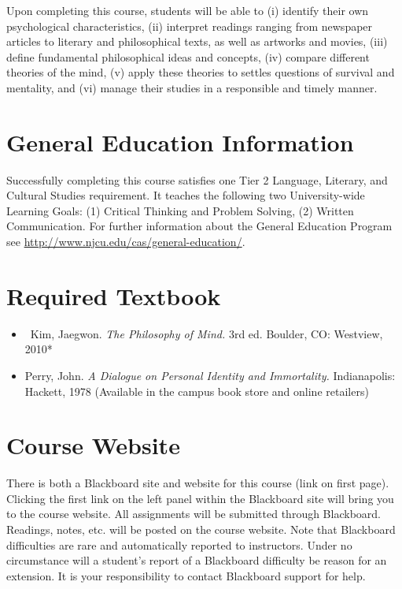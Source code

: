 \documentclass[article,oneside]{memoir}
\begin{document}
Upon completing this course, students will be able to  (i) identify their own psychological characteristics, (ii) interpret readings ranging from newspaper articles to literary and philosophical texts, as well as artworks and movies, (iii) define fundamental philosophical ideas and concepts, (iv) compare different theories of the mind, (v) apply these theories to settles questions of survival and mentality,  and  (vi) manage their studies in a responsible and timely manner. 





\section{General Education Information} 
Successfully completing this course satisfies one Tier 2 Language, Literary, and Cultural Studies requirement. It teaches the following two University-wide Learning Goals: (1) Critical Thinking and Problem Solving, (2) Written Communication. For further information about the General Education Program see \href{http://www.njcu.edu/cas/general-education/}{http://www.njcu.edu/cas/general-education/}.


\section{Required Textbook}

\begin{itemize}
\item\ Kim, Jaegwon. \emph{The Philosophy of Mind.} 3rd ed. Boulder, CO: Westview, 2010*
\item Perry, John. \emph{A Dialogue on Personal Identity and Immortality.}  Indianapolis: Hackett, 1978  (Available in the campus book store and online retailers)
\end{itemize}


\section{Course Website}
There is both a Blackboard site and website for this course (link on first page). Clicking the first link on the left panel within the Blackboard site will bring you to the course website. All assignments will be submitted through Blackboard. Readings, notes, etc. will be posted on the course website. Note that Blackboard difficulties are rare and automatically reported to instructors. Under no circumstance will a student's report of a Blackboard difficulty be reason for an extension. It is your responsibility to contact Blackboard support for help.
\end{document}
